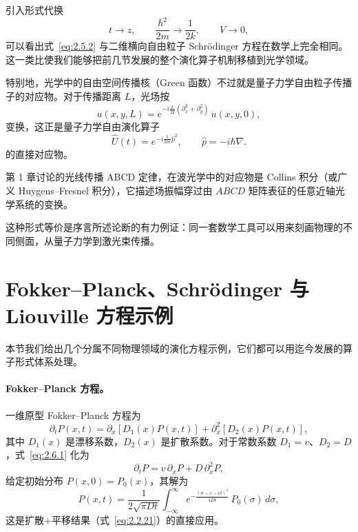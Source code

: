 引入形式代换
\begin{equation}
t\rightarrow z,\qquad
\frac{\hbar^{2}}{2m}\rightarrow\frac{1}{2k},\qquad
V\rightarrow 0,
\label{eq:2.5.3}
\end{equation}
可以看出式~\eqref{eq:2.5.2} 与二维横向自由粒子 Schr\"odinger 方程在数学上完全相同。这一类比使我们能够把前几节发展的整个演化算子机制移植到光学领域。

特别地，光学中的自由空间传播核（Green 函数）不过就是量子力学自由粒子传播子的对应物。对于传播距离 $L$，光场按
\begin{equation}
u(x,y,L)=e^{-i\frac{L}{2k}(\partial_{x}^{2}+\partial_{y}^{2})}\,u(x,y,0),
\label{eq:2.5.4}
\end{equation}
变换，这正是量子力学自由演化算子
\begin{equation}
\hat{U}(t)=e^{-i\frac{t}{2m}\hat{p}^{2}},\qquad \hat{p}=-i\hbar\nabla.
\label{eq:2.5.5}
\end{equation}
的直接对应物。

第 1 章讨论的光线传播 ABCD 定律，在波光学中的对应物是 Collins 积分（或广义 Huygens--Fresnel 积分），它描述场振幅穿过由 $ABCD$ 矩阵表征的任意近轴光学系统的变换。

这种形式等价是序言所述论断的有力例证：同一套数学工具可以用来刻画物理的不同侧面，从量子力学到激光束传播。

\section{Fokker--Planck、Schr\"odinger 与 Liouville 方程示例}

本节我们给出几个分属不同物理领域的演化方程示例，它们都可以用迄今发展的算子形式体系处理。

\paragraph{Fokker--Planck 方程。}
一维原型 Fokker--Planck 方程为
\begin{equation}
\partial_{t}P(x,t)=\partial_{x}\!\left[D_{1}(x)P(x,t)\right]
+\partial_{x}^{2}\!\left[D_{2}(x)P(x,t)\right],
\label{eq:2.6.1}
\end{equation}
其中 $D_{1}(x)$ 是漂移系数，$D_{2}(x)$ 是扩散系数。对于常数系数 $D_{1}=v$、$D_{2}=D$，式~\eqref{eq:2.6.1} 化为
\begin{equation}
\partial_{t}P=v\,\partial_{x}P+D\,\partial_{x}^{2}P,
\label{eq:2.6.2}
\end{equation}
给定初始分布 $P(x,0)=P_{0}(x)$，其解为
\begin{equation}
P(x,t)=\frac{1}{2\sqrt{\pi D t}}
\int_{-\infty}^{\infty}
e^{-\frac{(\sigma-x-vt)^{2}}{4Dt}}\,P_{0}(\sigma)\,d\sigma,
\label{eq:2.6.3}
\end{equation}
这是扩散+平移结果（式~\eqref{eq:2.2.21}）的直接应用。

